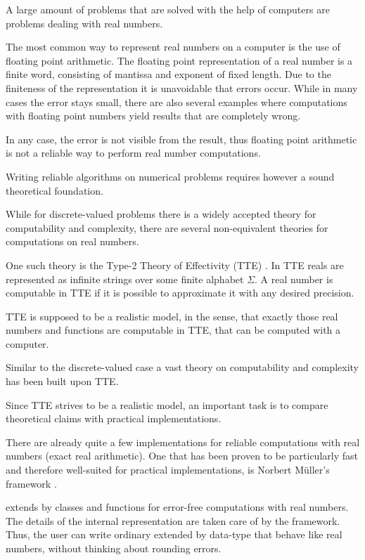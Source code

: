 A large amount of problems that are solved with the help of computers are
problems dealing with real numbers.

The most common way to represent real numbers on a computer is the use of floating point
arithmetic.
The floating point representation of a real number is a finite word, consisting
of mantissa and exponent of fixed length.
Due to the finiteness of the representation it is unavoidable that errors
occur.
While in many cases the error stays small, there are also several examples
where computations with floating point numbers yield results that are
completely wrong.

In any case, the error is not visible from the result, thus floating point
arithmetic is not a reliable way to perform real number computations.

Writing reliable algorithms on numerical problems requires however a sound
theoretical foundation.

While for discrete-valued problems there is a widely accepted theory for
computability and complexity, there are several non-equivalent theories for
computations on real numbers.

One such theory is the Type-2 Theory of Effectivity (TTE) \cite{Wei}.
In TTE reals are represented as infinite strings over some finite alphabet
$\Sigma$.
A real number is computable in TTE if it is possible to approximate it with any
desired precision.

TTE is supposed to be a realistic model, in the sense, that exactly those
real numbers and functions are computable in TTE, that can be computed with a
computer.

Similar to the discrete-valued case a vast theory on computability and
complexity has been built upon TTE.

Since TTE strives to be a realistic model, an important task is to compare
theoretical claims with practical implementations.

There are already quite a few implementations for reliable computations with
real numbers (exact real arithmetic).
One that has been proven to be particularly fast and therefore well-suited for
practical implementations, is Norbert M\"uller's \cc framework \irram
\cite{irram}.

\irram extends \cc by classes and functions for error-free computations with
real numbers.
The details of the internal representation are taken care of by the framework. 
Thus, the user can write ordinary \cc extended by data-type that behave like
real numbers, without thinking about rounding errors.

